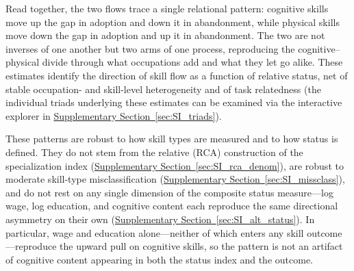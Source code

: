 \documentclass[11pt, letterpaper]{article} %
\begin{document}
Read together, the two flows trace a single relational pattern: cognitive skills move up the gap in adoption and down it in abandonment, while physical skills move down the gap in adoption and up it in abandonment. The two are not inverses of one another but two arms of one process, reproducing the cognitive–physical divide through what occupations add and what they let go alike. These estimates identify the direction of skill flow as a function of relative status, net of stable occupation- and skill-level heterogeneity and of task relatedness (the individual triads underlying these estimates can be examined via the interactive explorer in \hyperref[sec:SI_triads]{Supplementary Section~\ref*{sec:SI_triads}}).

These patterns are robust to how skill types are measured and to how status is defined. They do not stem from the relative (RCA) construction of the specialization index (\hyperref[sec:SI_rca_denom]{Supplementary Section~\ref*{sec:SI_rca_denom}}), are robust to moderate skill-type misclassification (\hyperref[sec:SI_missclass]{Supplementary Section~\ref*{sec:SI_missclass}}), and do not rest on any single dimension of the composite status measure---log wage, log education, and cognitive content each reproduce the same directional asymmetry on their own (\hyperref[sec:SI_alt_status]{Supplementary Section~\ref*{sec:SI_alt_status}}). In particular, wage and education alone---neither of which enters any skill outcome---reproduce the upward pull on cognitive skills, so the pattern is not an artifact of cognitive content appearing in both the status index and the outcome.

\vspace{10pt}
\end{document}
